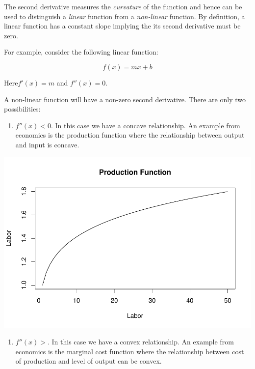 \documentclass[]{book}
\providecommand{\tightlist}{%
  \setlength{\itemsep}{0pt}\setlength{\parskip}{0pt}}
\theoremstyle{definition}
\theoremstyle{definition}
\theoremstyle{definition}
\theoremstyle{remark}
\let\BeginKnitrBlock\begin \let\EndKnitrBlock\end
\begin{document}
The second derivative measures the \emph{curvature} of the function and hence can be used to distinguish a \emph{linear} function from a \emph{non-linear} function. By definition, a linear function has a constant slope implying the its second derivative must be zero.

\BeginKnitrBlock{example}
\protect\hypertarget{exm:unnamed-chunk-18}{}{\label{exm:unnamed-chunk-18} }For example, consider the following linear function:

\[f(x) = mx +b\]

Here\(f'(x)=m\) and \(f''(x)=0\).
\EndKnitrBlock{example}

A non-linear function will have a non-zero second derivative. There are only two possibilities:

\begin{enumerate}
\def\labelenumi{\arabic{enumi}.}
\tightlist
\item
  \(f''(x)<0\). In this case we have a concave relationship. An example from economics is the production function where the relationship between output and input is concave.
\end{enumerate}

\includegraphics{bookdown-demo_files/figure-latex/unnamed-chunk-19-1.pdf}

\begin{enumerate}
\def\labelenumi{\arabic{enumi}.}
\setcounter{enumi}{1}
\tightlist
\item
  \(f''(x)>\). In this case we have a convex relationship. An example from economics is the marginal cost function where the relationship between cost of production and level of output can be convex.
\end{enumerate}
\end{document}

